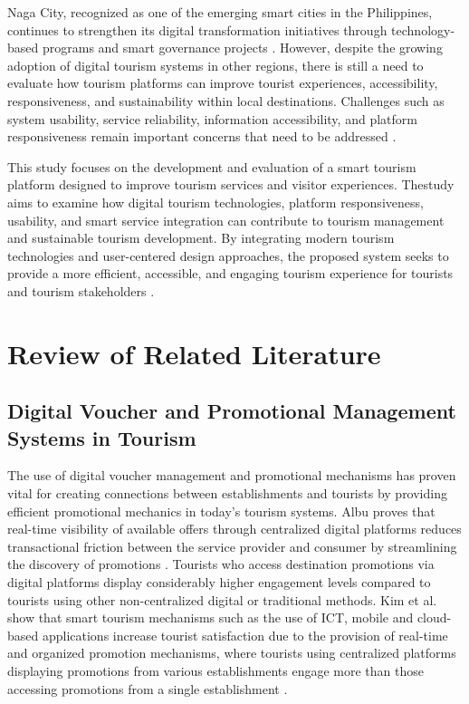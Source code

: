 \documentclass{research}
\begin{document}
Naga City, recognized as one of the emerging smart cities in the Philippines, continues to strengthen its digital transformation initiatives through technology-based programs and smart governance projects \cite{naga2025}. However, despite the growing adoption of digital tourism systems in other regions, there is still a need to evaluate how tourism platforms can improve tourist experiences, accessibility, responsiveness, and sustainability within local destinations. Challenges such as system usability, service reliability, information accessibility, and platform responsiveness remain important concerns that need to be addressed \cite{ramos2024}.

This study focuses on the development and evaluation of a smart tourism platform designed to improve tourism services and visitor experiences. Thestudy aims to examine how digital tourism technologies, platform responsiveness, usability, and smart service integration can contribute to tourism management and sustainable tourism development. By integrating modern tourism technologies and user-centered design approaches, the proposed system seeks to provide a more efficient, accessible, and engaging tourism experience for tourists and tourism stakeholders \cite{gretzel2023}.

\section{Review of Related Literature}

\subsection{Digital Voucher and Promotional Management Systems in Tourism}

The use of digital voucher management and promotional mechanisms has proven vital for creating connections between establishments and tourists by providing efficient promotional mechanics in today's tourism systems. Albu proves that real-time visibility of available offers through centralized digital platforms reduces transactional friction between the service provider and consumer by streamlining the discovery of promotions \cite{albu2025}. Tourists who access destination promotions via digital platforms display considerably higher engagement levels compared to tourists using other non-centralized digital or traditional methods. Kim et al. show that smart tourism mechanisms such as the use of ICT, mobile and cloud-based applications increase tourist satisfaction due to the provision of real-time and organized promotion mechanisms, where tourists using centralized platforms displaying promotions from various establishments engage more than those accessing promotions from a single establishment \cite{kim2021}.
\end{document}
